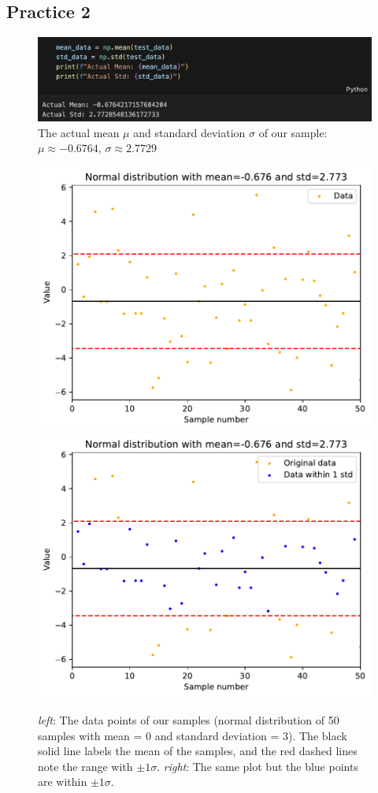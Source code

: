 \documentclass[12pt,a4paper]{article}
\begin{document}
\begin{CJK}{UTF8}{bkai}
\clearpage
\subsection{Practice 2}

\begin{figure}[h]
    \centering
    \includegraphics[width=0.8\linewidth]{figures/code/code_2_3.png}
    \caption{The actual mean $\mu$ and standard deviation $\sigma$ of our sample: $\mu \approx -0.6764$, $\sigma \approx 2.7729$}
    \label{fig:code_2_3}
\end{figure}
\begin{figure}[h]
    \centering
    \includegraphics[width=0.45\linewidth]{figures/practice_1_2_original.pdf}
    \includegraphics[width=0.45\linewidth]{figures/practice_1_2_picked.pdf}
    \caption{\textit{left}: The data points of our samples (normal distribution of 50 samples with mean = 0 and standard deviation = 3). The black solid line labels the mean of the samples, and the red dashed lines note the range with $\pm 1\sigma$. \textit{right}: The same plot but the blue points are within $\pm 1\sigma$.}
    \label{fig:practice_2_1}
\end{figure}


\end{CJK}
\end{document}
